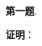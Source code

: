 
\usepackage[makeroom,thicklines]{cancel}

\renewcommand{\newpageorvspace}{\vspace{2em}}

\date{2022-10-21  第四次习题课}
\author{}



\maketitle


{\bf 第一题}. 

\newpageorvspace

{\bf 证明}： 


